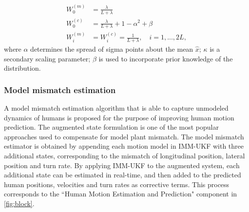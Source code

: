 \documentclass[journal]{IEEEtran}
\DeclareRobustCommand{\clnote}[1]{\ifthenelse{\boolean{include-notes}}%
{\textcolor{orange}{\textbf{CL: #1}}}{}}
\DeclareRobustCommand{\dhnote}[1]{\ifthenelse{\boolean{include-notes}}%
{\textcolor{blue}{\textbf{DH: #1}}}{}}
\begin{document}
    \begin{subequations}\label{eqn:ukf}
		\begin{align}
			W_0^{(m)}&=\frac{\lambda}{L+\lambda}\\
			W_0^{(c)}&=\frac{\lambda}{L+\lambda}+1-\alpha^2+\beta\\
			W_i^{(m)}&=W_i^{(c)}=\frac{1}{L+\lambda},\quad i=1,...,2L,
		\end{align}
	\end{subequations}\normalsize
	where $\alpha$ determines the spread of sigma points about the mean $\hat{x}$; $\kappa$ is a secondary scaling parameter; $\beta$ is used to incorporate prior knowledge of the distribution.	
    
	\subsubsection{Model mismatch estimation}\label{subsec:DOB}
    A model mismatch estimation algorithm that is able to capture unmodeled dynamics of humans is proposed for the purpose of improving human motion prediction. 
The augmented state formulation is one of the most popular approaches used to compensate for model plant mismatch\cite{EvaluationAEKF,wan2000unscented,jiang2015disturbance}.
 The model mismatch estimator is obtained by appending each motion model in IMM-UKF with three additional states, corresponding to the mismatch of longitudinal position, lateral position and turn rate.
	By applying IMM-UKF to the augmented system, each additional state can be estimated in real-time, and then added to the predicted human positions, velocities and turn rates as corrective terms.
	This process corresponds to the ``Human Motion Estimation and Prediction" component in \cref{fig:block}.
    
\end{document}

